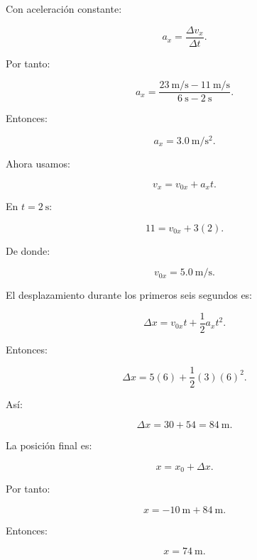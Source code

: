 \begin{explicacion}
Con aceleración constante:

\[
a_x
=
\frac{\Delta v_x}{\Delta t}.
\]

Por tanto:

\[
a_x
=
\frac{
\SI{23}{\meter\per\second}
-
\SI{11}{\meter\per\second}
}{
\SI{6}{\second}
-
\SI{2}{\second}
}.
\]

Entonces:

\[ \boxed{a_x=\SI{3.0}{\meter\per\second\squared}}. \]

Ahora usamos:

\[ v_x=v_{0x}+a_xt. \]

En \(t=\SI{2}{\second}\):

\[
11=v_{0x}+3(2).
\]

De donde:

\[ \boxed{v_{0x}=\SI{5.0}{\meter\per\second}}. \]

El desplazamiento durante los primeros seis segundos es:

\[
\Delta x
=
v_{0x}t+\frac{1}{2}a_xt^2.
\]

Entonces:

\[
\Delta x
=
5(6)
+
\frac{1}{2}(3)(6)^2.
\]

Así:

\[
\Delta x
=
30+54
=
\boxed{\SI{84}{\meter}}.
\]

La posición final es:

\[
x=x_0+\Delta x.
\]

Por tanto:

\[
x
=
-\SI{10}{\meter}
+
\SI{84}{\meter}.
\]

Entonces:

\[ \boxed{x=\SI{74}{\meter}}. \]
\end{explicacion}


